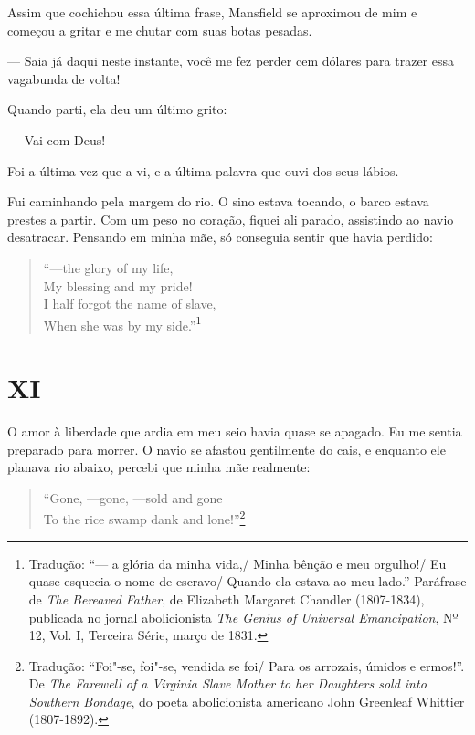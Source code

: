Assim que cochichou essa última frase, Mansfield se aproximou de mim e
começou a gritar e me chutar com suas botas pesadas.

--- Saia já daqui neste instante, você me fez perder cem dólares para
trazer essa vagabunda de volta!

Quando parti, ela deu um último grito:

--- Vai com Deus!

Foi a última vez que a vi, e a última palavra que ouvi dos seus lábios.

Fui caminhando pela margem do rio. O sino estava tocando, o barco estava
prestes a partir. Com um peso no coração, fiquei ali parado, assistindo
ao navio desatracar. Pensando em minha mãe, só conseguia sentir que
havia perdido:

\begin{verse}
``---the glory of my life,\\
My blessing and my pride!\\
I half forgot the name of slave,\\
When she was by my side.''\footnote{Tradução: ``--- a glória da minha vida,/ Minha bênção e meu orgulho!/ Eu quase esquecia o nome de escravo/ Quando ela estava ao meu lado.'' Paráfrase de \emph{The Bereaved Father}, de Elizabeth
  Margaret Chandler (1807-1834), publicada no jornal abolicionista
  \emph{The Genius of Universal Emancipation}, Nº 12, Vol. I, Terceira
  Série, março de 1831.}
\end{verse}

\chapter{XI}

O amor à liberdade que ardia em meu seio havia quase se apagado. Eu me
sentia preparado para morrer. O navio se afastou gentilmente do cais, e
enquanto ele planava rio abaixo, percebi que minha mãe realmente:

\begin{verse}
``Gone, ---gone, ---sold and gone\\
To the rice swamp dank and lone!''\footnote{Tradução: ``Foi"-se, foi"-se, vendida se foi/ Para os arrozais, úmidos e ermos!''. De \emph{The Farewell of a Virginia Slave Mother to
  her Daughters sold into Southern Bondage}, do poeta abolicionista
  americano John Greenleaf Whittier (1807-1892).}
\end{verse}

 

